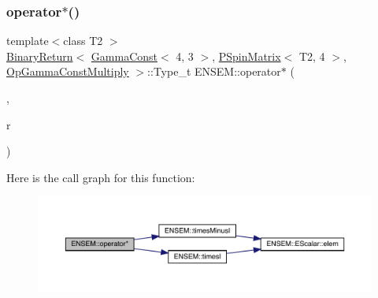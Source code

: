 \subsubsection{\texorpdfstring{operator$\ast$()}{operator*()}\hspace{0.1cm}{\footnotesize\ttfamily [4/64]}}
{\footnotesize\ttfamily template$<$class T2 $>$ \\
\mbox{\hyperlink{structENSEM_1_1BinaryReturn}{Binary\+Return}}$<$ \mbox{\hyperlink{classENSEM_1_1GammaConst}{Gamma\+Const}}$<$ 4, 3 $>$, \mbox{\hyperlink{classENSEM_1_1PSpinMatrix}{P\+Spin\+Matrix}}$<$ T2, 4 $>$, \mbox{\hyperlink{structENSEM_1_1OpGammaConstMultiply}{Op\+Gamma\+Const\+Multiply}} $>$\+::Type\+\_\+t E\+N\+S\+E\+M\+::operator$\ast$ (\begin{DoxyParamCaption}\item[{const \mbox{\hyperlink{classENSEM_1_1GammaConst}{Gamma\+Const}}$<$ 4, 3 $>$ \&}]{,  }\item[{const \mbox{\hyperlink{classENSEM_1_1PSpinMatrix}{P\+Spin\+Matrix}}$<$ T2, 4 $>$ \&}]{r }\end{DoxyParamCaption})\hspace{0.3cm}{\ttfamily [inline]}}

Here is the call graph for this function\+:\nopagebreak
\begin{figure}[H]
\begin{center}
\leavevmode
\includegraphics[width=350pt]{d6/df5/group__primspinmatrix_gaeffd66ff58d2cd7122d34c77e7109255_cgraph}
\end{center}
\end{figure}
\mbox{\label{group__primspinmatrix_gabc287f892d11c49158f8022c393a8516}} 

